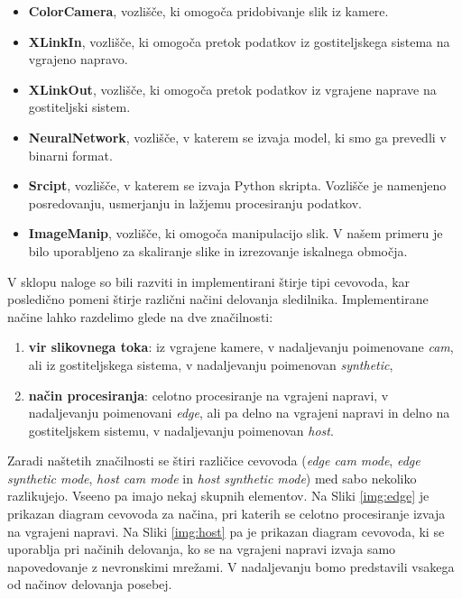 \documentclass[a4paper,12pt,openright]{book}
\begin{document}
\begin{itemize}
    \item \textbf{ColorCamera}, vozlišče, ki omogoča pridobivanje slik iz kamere.
    \item \textbf{XLinkIn}, vozlišče, ki omogoča pretok podatkov iz gostiteljskega sistema na vgrajeno napravo.
    \item \textbf{XLinkOut}, vozlišče, ki omogoča pretok podatkov iz vgrajene naprave na gostiteljski sistem.
    \item \textbf{NeuralNetwork}, vozlišče, v katerem se izvaja model, ki smo ga prevedli v binarni format.
    \item \textbf{Srcipt}, vozlišče, v katerem se izvaja Python skripta. Vozlišče je namenjeno posredovanju, usmerjanju in lažjemu procesiranju podatkov.
    \item \textbf{ImageManip}, vozlišče, ki omogoča manipulacijo slik. V našem primeru je bilo uporabljeno za skaliranje slike in izrezovanje iskalnega območja.
\end{itemize}


V sklopu naloge so bili razviti in implementirani štirje tipi cevovoda, kar posledično pomeni štirje različni načini delovanja sledilnika. Implementirane načine lahko razdelimo glede na dve značilnosti:

\begin{enumerate}
    \item \textbf{vir slikovnega toka}: iz vgrajene kamere, v nadaljevanju poimenovane \emph{cam}, ali iz gostiteljskega sistema, v nadaljevanju poimenovan \emph{synthetic},
    \item \textbf{način procesiranja}: celotno procesiranje na vgrajeni napravi, v nadaljevanju poimenovani \emph{edge}, ali pa delno na vgrajeni napravi in delno na gostiteljskem sistemu, v nadaljevanju poimenovan \emph{host}.
\end{enumerate}

Zaradi naštetih značilnosti se štiri različice cevovoda (\emph{edge cam mode}, \emph{edge synthetic mode}, \emph{host cam mode} in \emph{host synthetic mode}) med sabo nekoliko razlikujejo. Vseeno pa imajo nekaj skupnih elementov. Na Sliki \ref{img:edge} je prikazan diagram cevovoda za načina, pri katerih se celotno procesiranje izvaja na vgrajeni napravi. Na Sliki \ref{img:host} pa je prikazan diagram cevovoda, ki se uporablja pri načinih delovanja, ko se na vgrajeni napravi izvaja samo napovedovanje z nevronskimi mrežami. V nadaljevanju bomo predstavili vsakega od načinov delovanja posebej.
\end{document}
